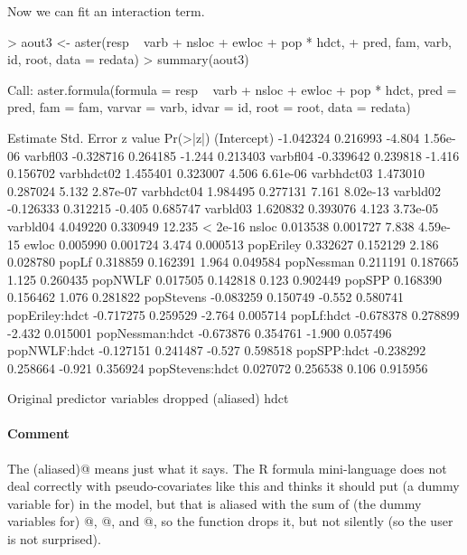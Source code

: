 \documentclass[11pt]{article}
\begin{document}
Now we can fit an interaction term.
\begin{Schunk}
\begin{Sinput}
> aout3 <- aster(resp ~ varb + nsloc + ewloc + pop * hdct, 
+     pred, fam, varb, id, root, data = redata)
> summary(aout3)
\end{Sinput}
\begin{Soutput}
Call:
aster.formula(formula = resp ~ varb + nsloc + ewloc + pop * hdct, 
    pred = pred, fam = fam, varvar = varb, idvar = id, root = root, 
    data = redata)

                 Estimate Std. Error z value Pr(>|z|)
(Intercept)     -1.042324   0.216993  -4.804 1.56e-06
varbfl03        -0.328716   0.264185  -1.244 0.213403
varbfl04        -0.339642   0.239818  -1.416 0.156702
varbhdct02       1.455401   0.323007   4.506 6.61e-06
varbhdct03       1.473010   0.287024   5.132 2.87e-07
varbhdct04       1.984495   0.277131   7.161 8.02e-13
varbld02        -0.126333   0.312215  -0.405 0.685747
varbld03         1.620832   0.393076   4.123 3.73e-05
varbld04         4.049220   0.330949  12.235  < 2e-16
nsloc            0.013538   0.001727   7.838 4.59e-15
ewloc            0.005990   0.001724   3.474 0.000513
popEriley        0.332627   0.152129   2.186 0.028780
popLf            0.318859   0.162391   1.964 0.049584
popNessman       0.211191   0.187665   1.125 0.260435
popNWLF          0.017505   0.142818   0.123 0.902449
popSPP           0.168390   0.156462   1.076 0.281822
popStevens      -0.083259   0.150749  -0.552 0.580741
popEriley:hdct  -0.717275   0.259529  -2.764 0.005714
popLf:hdct      -0.678378   0.278899  -2.432 0.015001
popNessman:hdct -0.673876   0.354761  -1.900 0.057496
popNWLF:hdct    -0.127151   0.241487  -0.527 0.598518
popSPP:hdct     -0.238292   0.258664  -0.921 0.356924
popStevens:hdct  0.027072   0.256538   0.106 0.915956

Original predictor variables dropped (aliased)
     hdct 
\end{Soutput}
\end{Schunk}

\paragraph{Comment}  The \verb@dropped (aliased)@ means just what
it says.  The R formula mini-language does not deal correctly with
pseudo-covariates like this and thinks it should put (a dummy variable
for) \verb@hdct@ in the model, but that is aliased with the sum of
(the dummy variables for) @, @,
and @, so the \verb@aster@ function drops it, but
not silently (so the user is not surprised).
\end{document}
